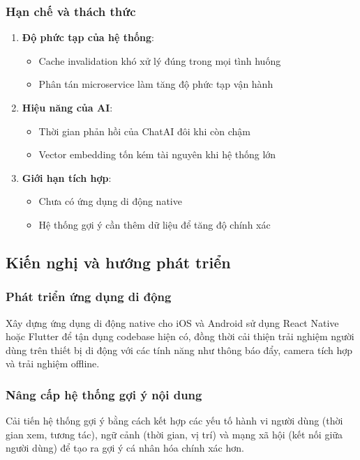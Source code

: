 \subsubsection{Hạn chế và thách thức}
\begin{enumerate}
    \item \textbf{Độ phức tạp của hệ thống}:
    \begin{itemize}
        \item Cache invalidation khó xử lý đúng trong mọi tình huống
        \item Phân tán microservice làm tăng độ phức tạp vận hành
    \end{itemize}
    
    \item \textbf{Hiệu năng của AI}:
    \begin{itemize}
        \item Thời gian phản hồi của ChatAI đôi khi còn chậm
        \item Vector embedding tốn kém tài nguyên khi hệ thống lớn
    \end{itemize}
    
    \item \textbf{Giới hạn tích hợp}:
    \begin{itemize}
        \item Chưa có ứng dụng di động native
        \item Hệ thống gợi ý cần thêm dữ liệu để tăng độ chính xác
    \end{itemize}
\end{enumerate}

\subsection{Kiến nghị và hướng phát triển}

\subsubsection{Phát triển ứng dụng di động}
Xây dựng ứng dụng di động native cho iOS và Android sử dụng React Native hoặc Flutter để tận dụng codebase hiện có, đồng thời cải thiện trải nghiệm người dùng trên thiết bị di động với các tính năng như thông báo đẩy, camera tích hợp và trải nghiệm offline.

\subsubsection{Nâng cấp hệ thống gợi ý nội dung}
Cải tiến hệ thống gợi ý bằng cách kết hợp các yếu tố hành vi người dùng (thời gian xem, tương tác), ngữ cảnh (thời gian, vị trí) và mạng xã hội (kết nối giữa người dùng) để tạo ra gợi ý cá nhân hóa chính xác hơn.

